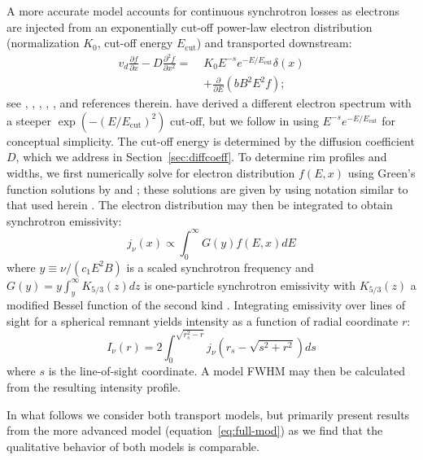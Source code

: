 \documentclass[iop, apj, numberedappendix, twocolappendix]{emulateapj}
\newcommand*{\mt}{\mathrm}
\newcommand*{\ptl}{\partial}
\newcommand*{\Ecut}{E_{\mt{cut}}}
\begin{document}
A more accurate model accounts for continuous synchrotron losses as electrons
are injected from an exponentially cut-off power-law electron distribution
(normalization $K_0$, cut-off energy $\Ecut$) and transported downstream:
\begin{align} \label{eq:full-mod}
    v_d \frac{\ptl f}{\ptl x} - D \frac{\ptl^2 f}{\ptl x^2} =\;
    &K_0 E^{-s} e^{-E/\Ecut} \delta(x) \nonumber \\
    &+ \frac{\ptl}{\ptl E} \left(bB^2E^2f\right) ;
\end{align}
see \citet{webb1984}, \citet{berezhko2004}, \citet{cassam-chenai2007},
\citet{morlino2010}, \citet{rettig2012}, and references therein.
\citet{zirakashvili2007} have derived a different electron spectrum with a
steeper $\exp\left(- \left(E/\Ecut\right)^2\right)$ cut-off, but we follow
 in using $E^{-s} e^{-E/\Ecut}$ for conceptual
simplicity.  The cut-off energy is determined by the diffusion coefficient $D$,
which we address in Section~\ref{sec:diffcoeff}.  To determine rim profiles and
widths, we first numerically solve for electron distribution $f(E,x)$ using
Green's function solutions by \citet{lerche1980} and \citet{rettig2012}; these
solutions are given by  using notation similar to that
used herein .  The electron distribution may then be
integrated to obtain synchrotron emissivity:
\begin{equation} \label{eq:emissivity}
    j_{\nu}(x) \propto \int_0^\infty G(y) f(E,x) dE
\end{equation}
where $y \equiv \nu/(c_1 E^2 B)$ is a scaled synchrotron frequency and
$G(y) = y \int_y^\infty K_{5/3}(z) dz$ is one-particle synchrotron emissivity
with $K_{5/3}(z)$ a modified Bessel function of the second kind
\citep{pacholczyk1970}.  Integrating emissivity over lines of sight for a
spherical remnant yields intensity as a function of radial coordinate $r$:
\begin{equation} \label{eq:intensity}
    I_{\nu}(r) = 2 \int_0^{\sqrt{r_s^2 - r}}
                    j_{\nu} \left( r_s - \sqrt{s^2 + r^2} \right) ds
\end{equation}
where $s$ is the line-of-sight coordinate.  A model FWHM may then be calculated
from the resulting intensity profile.

In what follows we consider both transport models, but primarily present
results from the more advanced model (equation~\eqref{eq:full-mod}) as we find
that the qualitative behavior of both models is comparable.
\end{document}

